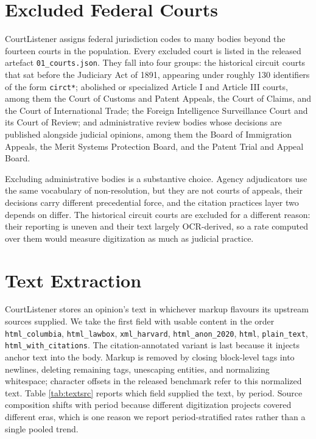 \section{Excluded Federal Courts}
\label{app:courts}
CourtListener assigns federal jurisdiction codes to many bodies beyond the
fourteen courts in the population. Every excluded court is listed in the released
artefact \texttt{01\_courts.json}. They fall into four groups: the historical
circuit courts that sat before the Judiciary Act of 1891, appearing under roughly
130 identifiers of the form \texttt{circt*}; abolished or specialized Article I
and Article III courts, among them the Court of Customs and Patent Appeals, the
Court of Claims, and the Court of International Trade; the Foreign Intelligence
Surveillance Court and its Court of Review; and administrative review bodies
whose decisions are published alongside judicial opinions, among them the Board
of Immigration Appeals, the Merit Systems Protection Board, and the Patent Trial
and Appeal Board.

Excluding administrative bodies is a substantive choice. Agency adjudicators use
the same vocabulary of non-resolution, but they are not courts of appeals, their
decisions carry different precedential force, and the citation practices layer
two depends on differ. The historical circuit courts are excluded for a different
reason: their reporting is uneven and their text largely OCR-derived, so a rate
computed over them would measure digitization as much as judicial practice.

\section{Text Extraction}
\label{app:text}

CourtListener stores an opinion's text in whichever markup flavours its upstream
sources supplied. We take the first field with usable content in the order
\texttt{html\_columbia}, \texttt{html\_lawbox}, \texttt{xml\_harvard},
\texttt{html\_anon\_2020}, \texttt{html}, \texttt{plain\_text},
\texttt{html\_with\_citations}. The citation-annotated variant is last because it
injects anchor text into the body. Markup is removed by closing block-level tags
into newlines, deleting remaining tags, unescaping entities, and normalizing
whitespace; character offsets in the released benchmark refer to this normalized
text. Table \ref{tab:textsrc} reports which field supplied the text, by period.
Source composition shifts with period because different digitization projects
covered different eras, which is one reason we report period-stratified rates
rather than a single pooled trend.


